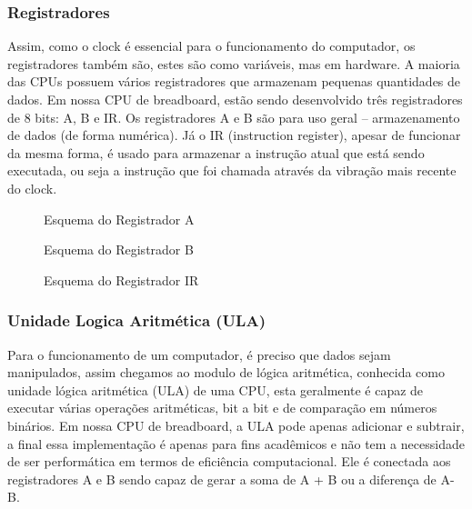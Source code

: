 \subsubsection{Registradores}
Assim, como o clock é essencial para o funcionamento do computador, os registradores também são, estes são como variáveis, mas em hardware. A maioria das CPUs possuem vários registradores que armazenam pequenas quantidades de dados. Em nossa CPU de breadboard, estão sendo desenvolvido três registradores de 8 bits: A, B e IR. Os registradores A e B são para uso geral – armazenamento de dados (de forma numérica). Já o IR (instruction register), apesar de funcionar da mesma forma, é usado para armazenar a instrução atual que está sendo executada, ou seja a instrução que foi chamada através da vibração mais recente do clock.

\vspace{1cm}
\begin{figure}[H] \centering 
  \caption{\label{schematics_a_register} Esquema do Registrador A} 
\end{figure}

\vspace{1cm}
\begin{figure}[H] \centering 
  \caption{\label{schematics_b_register} Esquema do Registrador B} 
\end{figure}

\vspace{1cm}
\begin{figure}[H] \centering 
  \caption{\label{schematics_ir} Esquema do Registrador IR} 
\end{figure}

\subsubsection{Unidade Logica Aritmética  (ULA)}
Para o funcionamento de um computador, é preciso que dados sejam manipulados, assim chegamos ao modulo de lógica aritmética, conhecida como unidade lógica aritmética (ULA) de uma CPU, esta geralmente é capaz de executar várias operações aritméticas, bit a bit e de comparação em números binários. Em nossa CPU de breadboard, a ULA pode apenas adicionar e subtrair, a final essa implementação é apenas para fins acadêmicos e não tem a necessidade de ser performática em termos de eficiência computacional. Ele é conectada aos registradores A e B sendo capaz de gerar a soma de A + B ou a diferença de A-B.

